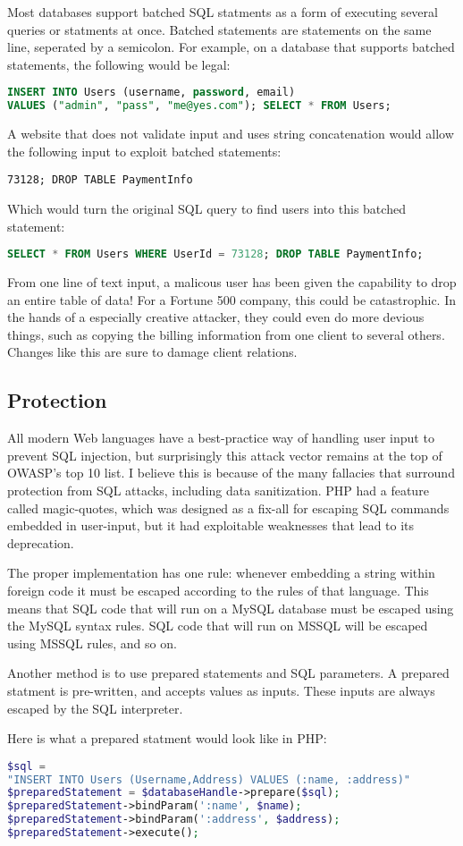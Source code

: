 Most databases support batched SQL statments as a form of executing several queries or statments at once. Batched statements are statements on the same line, seperated by a semicolon. For example, on a database that supports batched statements, the following would be legal:
\begin{lstlisting}[language = SQL]
INSERT INTO Users (username, password, email)
VALUES ("admin", "pass", "me@yes.com"); SELECT * FROM Users;
\end{lstlisting}
A website that does not validate input and uses string concatenation would allow the following input to exploit batched statements:
\begin{verbatim}
73128; DROP TABLE PaymentInfo
\end{verbatim}
Which would turn the original SQL query to find users into this batched statement:
\begin{lstlisting}[language = SQL]
SELECT * FROM Users WHERE UserId = 73128; DROP TABLE PaymentInfo;
\end{lstlisting}
From one line of text input, a malicous user has been given the capability to drop an entire table of data! For a Fortune 500 company, this could be catastrophic. In the hands of a especially creative attacker, they could even do more devious things, such as copying the billing information from one client to several others. Changes like this are sure to damage client relations.

\subsection{Protection}

All modern Web languages have a best-practice way of handling user input to prevent SQL injection, but surprisingly this attack vector remains at the top of OWASP's top 10 list. I believe this is because of the many fallacies that surround protection from SQL attacks, including data sanitization. PHP had a feature called magic-quotes, which was designed as a fix-all for escaping SQL commands embedded in user-input, but it had exploitable weaknesses that lead to its deprecation.

The proper implementation has one rule: whenever embedding a string within foreign code it must be escaped according to the rules of that language. This means that SQL code that will run on a MySQL database must be escaped using the MySQL syntax rules. SQL code that will run on MSSQL will be escaped using MSSQL rules, and so on.

Another method is to use prepared statements and SQL parameters. A prepared statment is pre-written, and accepts values as inputs. These inputs are always escaped by the SQL interpreter.

Here is what a prepared statment would look like in PHP:
\begin{lstlisting}[language = PHP]
$sql =
"INSERT INTO Users (Username,Address) VALUES (:name, :address)"
$preparedStatement = $databaseHandle->prepare($sql);
$preparedStatement->bindParam(':name', $name);
$preparedStatement->bindParam(':address', $address);
$preparedStatement->execute();
\end{lstlisting}
